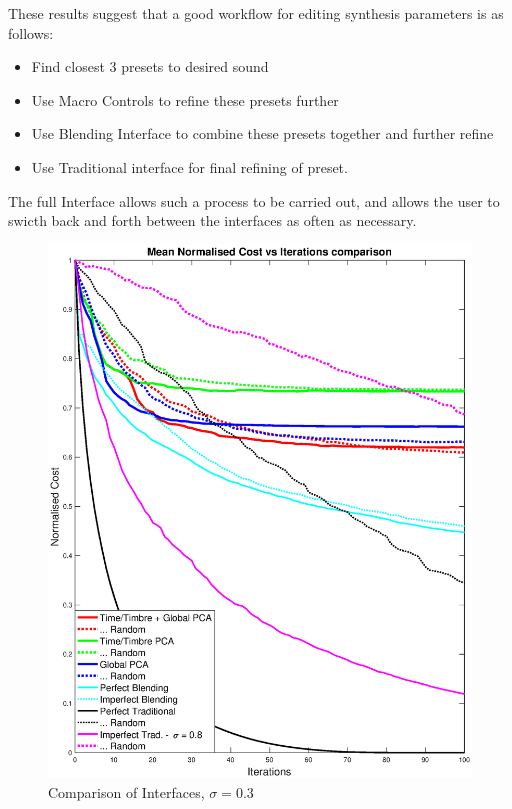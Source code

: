 \documentclass[11pt, oneside]{report}   	%
\begin{document}
These results suggest that a good workflow for editing synthesis parameters is as follows:
\begin{itemize}
	\item Find closest 3 presets to desired sound
	\item Use Macro Controls to refine these presets further
	\item Use Blending Interface to combine these presets together and further refine
	\item Use Traditional interface for final refining of preset.
\end{itemize}
The full Interface allows such a process to be carried out, and allows the user to swicth back and forth between the interfaces as often as necessary.

\begin{figure}
	\centering
	\includegraphics[width = \textwidth]{comparisonOfAllInterfaceGraph2.eps}
	\caption{Comparison of Interfaces, $\sigma = 0.3$}
	\label{fig:CombinedTest1}
\end{figure}
\end{document}
